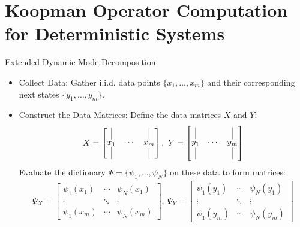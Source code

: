 \documentclass{beamer}
\begin{document}
	
	\section{Koopman Operator Computation for Deterministic Systems}
	
	\begin{frame}{Extended Dynamic Mode Decomposition}
		\begin{itemize}
			\item Collect Data: Gather i.i.d. data points \( \{ x_1, \dots, x_m \} \) and their corresponding next states \( \{ y_1, \dots, y_m \} \).
			
			\item Construct the Data Matrices:
			Define the data matrices \( X \) and \( Y \):
			\begin{gather*}
				X = \begin{bmatrix} 
					\underset{\rule{0.1mm}{5mm}}{\overset{\rule{0.1mm}{5mm}}{x_1}} & \cdots & \underset{\rule{0.1mm}{5mm}}{\overset{\rule{0.1mm}{5mm}}{x_m}}
				\end{bmatrix}, \
				Y = \begin{bmatrix} 
					\underset{\rule{0.1mm}{5mm}}{\overset{\rule{0.1mm}{5mm}}{y_1}} & \cdots & \underset{\rule{0.1mm}{5mm}}{\overset{\rule{0.1mm}{5mm}}{y_m}}
				\end{bmatrix}
			\end{gather*}
			Evaluate the dictionary \( \Psi = \{\psi_1, \dots, \psi_N\} \) on these data to form matrices:
			\begin{gather*}
				\Psi_X =\begin{bmatrix}
					\psi_1(x_1) & \cdots & \psi_{N}(x_1) \\
					\vdots & \ddots & \vdots \\
					\psi_1(x_m) & \cdots & \psi_{N}(x_m)
				\end{bmatrix} , \
				\Psi_Y = \begin{bmatrix}
					\psi_1(y_1) & \cdots & \psi_{N}(y_1) \\
					\vdots & \ddots & \vdots \\
					\psi_1(y_m) & \cdots & \psi_{N}(y_m)
				\end{bmatrix}
			\end{gather*}
		\end{itemize}
	\end{frame}
	
\end{document}
